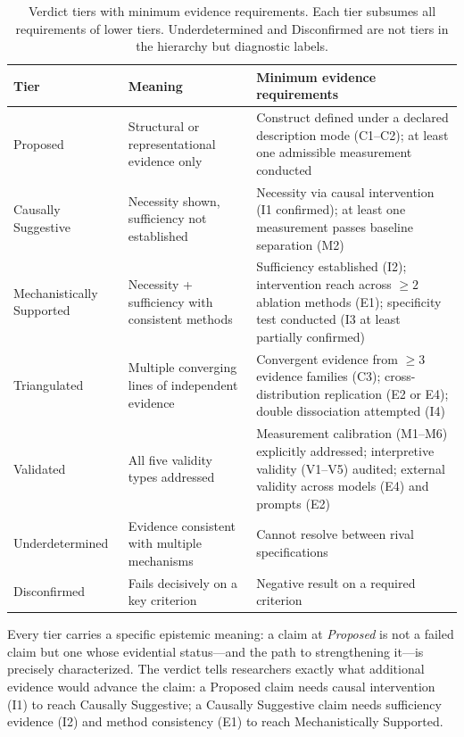 \documentclass{article}
\begin{document}
\begin{table}[H]
\centering
\small
\caption{Verdict tiers with minimum evidence requirements. Each tier subsumes all requirements of lower tiers. Underdetermined and Disconfirmed are not tiers in the hierarchy but diagnostic labels.}
\label{tab:verdicts}
\label{tab:tier-promotion}
\renewcommand{\arraystretch}{1.15}
\begin{tabular}{@{}>{\raggedright\arraybackslash}p{2.2cm}>{\raggedright\arraybackslash}p{3.4cm}>{\raggedright\arraybackslash}p{7.0cm}@{}}
\toprule
\textbf{Tier} & \textbf{Meaning} & \textbf{Minimum evidence requirements} \\
\midrule
Proposed & Structural or representational evidence only & Construct defined under a declared description mode (C1--C2); at least one admissible measurement conducted \\
\midrule
Causally Suggestive & Necessity shown, sufficiency not established & Necessity via causal intervention (I1 confirmed); at least one measurement passes baseline separation (M2) \\
\midrule
Mechanistically Supported & Necessity + sufficiency with consistent methods & Sufficiency established (I2); intervention reach across $\geq 2$ ablation methods (E1); specificity test conducted (I3 at least partially confirmed) \\
\midrule
Triangulated & Multiple converging lines of independent evidence & Convergent evidence from $\geq 3$ evidence families (C3); cross-distribution replication (E2 or E4); double dissociation attempted (I4) \\
\midrule
Validated & All five validity types addressed & Measurement calibration (M1--M6) explicitly addressed; interpretive validity (V1--V5) audited; external validity across models (E4) and prompts (E2) \\
\midrule
Underdetermined & Evidence consistent with multiple mechanisms & Cannot resolve between rival specifications \\
\midrule
Disconfirmed & Fails decisively on a key criterion & Negative result on a required criterion \\
\bottomrule
\end{tabular}
\end{table}

Every tier carries a specific epistemic meaning: a claim at \emph{Proposed} is not a failed claim but one whose evidential status---and the path to strengthening it---is precisely characterized. The verdict tells researchers exactly what additional evidence would advance the claim: a Proposed claim needs causal intervention (I1) to reach Causally Suggestive; a Causally Suggestive claim needs sufficiency evidence (I2) and method consistency (E1) to reach Mechanistically Supported.
\end{document}

